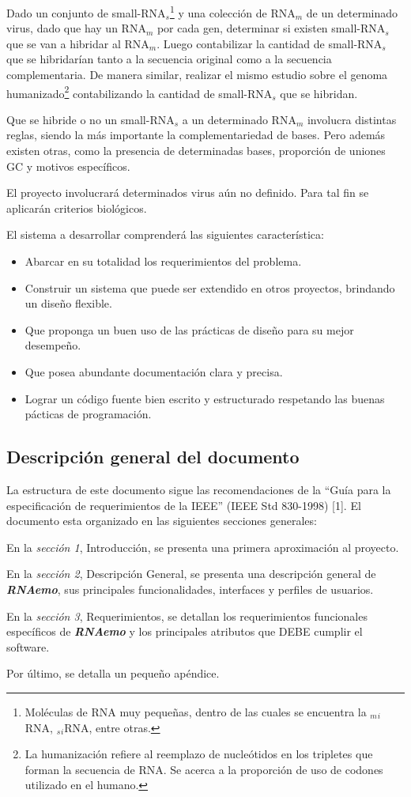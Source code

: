 \documentclass[12pt,a4paper,spanish]{article}
\newcommand{\rnaemo}{\textbf{\emph{RNAemo}}}
\begin{document}
\par Dado un conjunto de small-RNA$_s$\footnote{Moléculas de RNA muy pequeñas, dentro de las cuales se encuentra la $_m$$_i$RNA, $_s$$_i$RNA, entre otras.} y una colección de RNA$_m$ de un determinado virus, dado que hay un RNA$_m$ por cada gen, determinar si existen small-RNA$_s$ que se van a hibridar al RNA$_m$. Luego contabilizar la cantidad de small-RNA$_s$ que se hibridarían tanto a la secuencia original como a la secuencia complementaria. De manera similar, realizar el mismo estudio sobre el genoma humanizado\footnote{La humanización refiere al reemplazo de nucleótidos en los tripletes que forman la secuencia de RNA. Se acerca a la proporción de uso de codones utilizado en el humano.} contabilizando la cantidad de small-RNA$_s$ que se hibridan. 
\par Que se hibride o no un small-RNA$_s$ a un determinado RNA$_m$ involucra distintas reglas, siendo la más importante la complementariedad de bases. Pero además existen otras, como la presencia de determinadas bases, proporción de uniones GC y motivos específicos.

\par El proyecto involucrará determinados virus aún no definido. Para tal fin se aplicarán criterios biológicos.

\par El sistema a desarrollar comprenderá las siguientes característica:
\begin{itemize}
	\item Abarcar en su totalidad los requerimientos del problema.
	\item Construir un sistema que puede ser extendido en otros proyectos, brindando un diseño flexible. 
	\item Que proponga un buen uso de las prácticas de diseño para su mejor desempeño.
	\item Que posea abundante documentación clara y precisa.
	\item Lograr un código fuente bien escrito y estructurado respetando las buenas pácticas de programación.
\end{itemize}

\subsection{Descripción general del documento}
\par La estructura de este documento sigue las recomendaciones de la ``Guía para
la especificación de requerimientos de la IEEE'' (IEEE Std 830-1998) [1].
El documento esta organizado en las siguientes secciones generales: 
\par En la \textit{sección 1}, Introducción, se presenta una primera aproximación al proyecto. 
\par En la \textit{sección 2}, Descripción General, se presenta una descripción general de \rnaemo, sus principales
funcionalidades, interfaces y perfiles de usuarios. 
\par En la \textit{sección 3}, Requerimientos, se detallan los requerimientos funcionales específicos de \textbf{\emph{RNAemo}} y
 los principales atributos que DEBE cumplir el software.
\par Por último, se detalla un pequeño apéndice.
\end{document}
